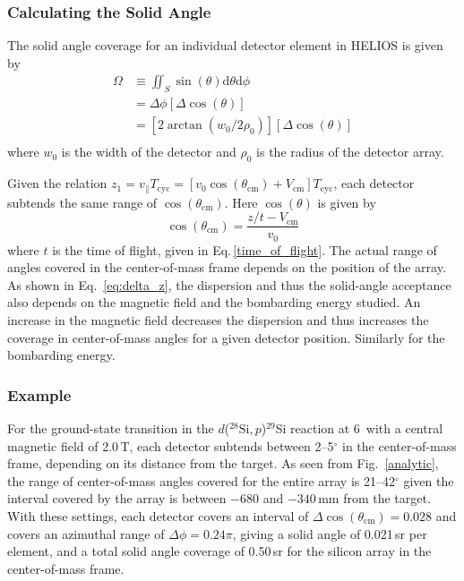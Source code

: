 \subsubsection{Calculating the Solid Angle}
The solid angle coverage for an individual detector element in HELIOS is given by
\begin{equation}
\begin{split}
\Omega&\equiv\iint_{S}\sin(\theta)\mathrm{d}\theta\mathrm{d}\phi\\
&=\Delta \phi[\Delta \cos(\theta)]\\
&=[2\arctan(w_0/2\rho_0)][\Delta \cos(\theta)]\\
\end{split}
\label{solid_ang}
\end{equation}
where $w_0$ is the width of the detector and $\rho_0$ is the radius of the detector array.

Given the relation $z_1=v_\parallel T_\mathrm{cyc}=[v_{0}\cos(\theta_\mathrm{cm})+V_\mathrm{cm}]T_\mathrm{cyc}$, each detector subtends the same range of $\cos(\theta_\mathrm{cm})$.  Here $\cos(\theta)$ is given by
\begin{equation}
\cos(\theta_\mathrm{cm})=\dfrac{z/t-V_\mathrm{cm}}{v_0}
\label{new_costhetacm}
\end{equation}
where $t$ is the time of flight, given in Eq.\,\ref{time_of_flight}.  The actual range of angles covered in the center-of-mass
frame depends on the position of
the array.  As shown in Eq.~\ref{eq:delta_z}, the dispersion and thus the solid-angle acceptance also depends on the magnetic field and the bombarding energy studied.  An increase in the magnetic field decreases the dispersion 
and thus increases the coverage in center-of-mass angles for a given detector
position.  Similarly for the bombarding energy.

\subsubsection{Example}
For the
ground-\-state transition in the $d$($^{28}\mathrm{Si},p$)$^{29}$Si reaction at
6\,\AMeV{} with a central magnetic field of 2.0\,T, each detector subtends between 2--5$^\circ$ in the center-of-mass frame, depending on its distance from the target.  As seen from Fig.~\ref{analytic}, the range of
center-of-mass angles covered for the entire array is 21--42$^\circ$ given the interval covered by the array is between $-680$ and $-340$\,mm from the target.   With these settings, each detector
covers an interval of $\Delta \cos(\theta_\mathrm{cm})=0.028$ and 
covers an azimuthal range of $\Delta \phi = 0.24\pi$, giving a solid angle of 0.021\,sr per
element, and a total solid angle coverage of 0.50\,sr for the silicon
array in the center-of-mass frame.

